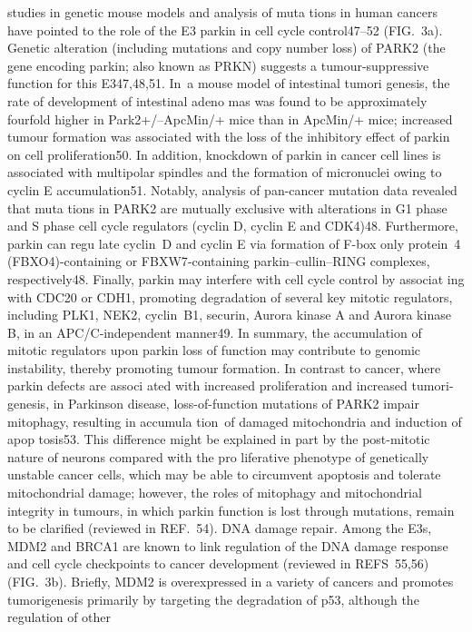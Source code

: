 ­studies in genetic mouse models and analysis of muta­
tions in human cancers have pointed to the role of
the E3 parkin in cell cycle control47–52 (FIG. 3a). Genetic
alteration (including mutations and copy number loss)
of PARK2 (the gene encoding parkin; also known as
PRKN) suggests a tumour-suppressive function for
this E347,48,51. In a mouse model of intestinal tumori­
genesis, the rate of development of intestinal adeno­
mas was found to be approximately fourfold higher in
Park2+/–ApcMin/+ mice than in ApcMin/+ mice; increased
tumour formation was associated with the loss of the
inhibitory effect of parkin on cell proliferation50. In
addition, knockdown of parkin in cancer cell lines is
associated with multi­polar spindles and the formation
of ­micronuclei owing to cyclin E accumulation51. Notably,
analysis of pan-­cancer mutation data revealed that muta­
tions in PARK2 are mutually exclusive with alterations
in G1 phase and S phase cell cycle regulators (cyclin D,
cyclin E and CDK4)48. Furthermore, parkin can regu­
late cyclin D and cyclin E via formation of F-box only
protein 4 (FBXO4)-containing or FBXW7‑containing
parkin–cullin–RING complexes, respectively48. Finally,
parkin may interfere with cell cycle control by associat­
ing with CDC20 or CDH1, promoting degradation of
several key mitotic regulators, including PLK1, NEK2,
cyclin B1, securin, Aurora kinase A and Aurora kinase
B, in an APC/C‑independent manner49. In summary, the
accumulation of mitotic regulators upon parkin loss of
function may contribute to genomic instability, thereby
promoting tumour formation.
In contrast to cancer, where parkin defects are associ­
ated with increased proliferation and increased tumori­
genesis, in Parkinson disease, loss-of-function mutations
of PARK2 impair mitophagy, resulting in accumula­
tion of damaged mitochondria and induction of apop­
tosis53. This difference might be explained in part by the
post-mitotic nature of neurons compared with the pro­
liferative phenotype of genetically unstable cancer cells,
which may be able to circumvent apoptosis and tolerate
mitochondrial damage; however, the roles of mitophagy
and mitochondrial integrity in tumours, in which parkin
function is lost through mutations, remain to be clarified
(reviewed in REF. 54).
DNA damage repair. Among the E3s, MDM2 and
BRCA1 are known to link regulation of the DNA
damage response and cell cycle checkpoints to cancer
development (reviewed in REFS 55,56) (FIG. 3b). Briefly,
MDM2 is overexpressed in a variety of cancers and
promotes tumorigenesis primarily by targeting the
degradation of p53, although the regulation of other
